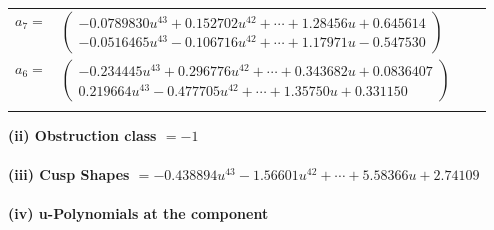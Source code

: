 \documentclass[1p]{elsarticle_modified}
\theoremstyle{definition}
\begin{document}
\begin{tabular}{m{7pt} m{180pt} m{7pt} m{180pt} }
\flushright $a_{7}=$&$\begin{pmatrix}-0.0789830 u^{43}+0.152702 u^{42}+\cdots+1.28456 u+0.645614\\-0.0516465 u^{43}-0.106716 u^{42}+\cdots+1.17971 u-0.547530\end{pmatrix}$ \\
\flushright $a_{6}=$&$\begin{pmatrix}-0.234445 u^{43}+0.296776 u^{42}+\cdots+0.343682 u+0.0836407\\0.219664 u^{43}-0.477705 u^{42}+\cdots+1.35750 u+0.331150\end{pmatrix}$\\&\end{tabular}
\flushleft \textbf{(ii) Obstruction class $= -1$}\\~\\
\flushleft \textbf{(iii) Cusp Shapes $= -0.438894 u^{43}-1.56601 u^{42}+\cdots+5.58366 u+2.74109$}\\~\\
\newpage\renewcommand{\arraystretch}{1}
\flushleft \textbf{(iv) u-Polynomials at the component}\newline \\
\end{document}
